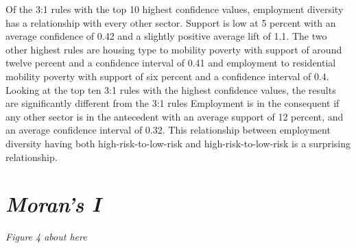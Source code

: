 Of the 3:1 rules with the top 10 highest confidence values, employment diversity has a relationship with every other sector. Support is low at 5 percent with an average confidence of 0.42 and a slightly positive average lift of 1.1. The two other highest rules are housing type to mobility poverty with support of around twelve percent and a confidence interval of 0.41 and employment to residential mobility poverty with support of six percent and a confidence interval of 0.4. Looking at the top ten 3:1 rules with the highest confidence values, the results are significantly different from the 3:1 rules Employment is in the consequent if any other sector is in the antecedent with an average support of 12 percent, and an average confidence interval of 0.32. This relationship between employment diversity having both high-risk-to-low-risk and high-risk-to-low-risk is a surprising relationship. 

\section{\textit{Moran's I}}

\textit{Figure 4 about here}

